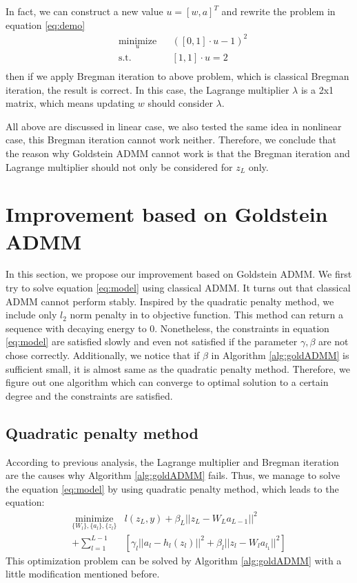 \documentclass[letterpaper, 10 pt, conference]{ieeeconf}  %
\begin{document}
In fact, we can construct a new value $u = [w,a]^T$ and rewrite the problem in equation \eqref{eq:demo}
\begin{equation}
\begin{aligned}
& \underset{u}{\text{minimize}}  & & ([0,1]\cdot u-1)^2 \\
& \text{s.t.} & & [1,1] \cdot u = 2\\
\end{aligned}
\end{equation}
then if we apply Bregman iteration to above problem, which is classical Bregman iteration, the result is correct. In this case, the Lagrange multiplier $\lambda$ is a 2x1 matrix, which means updating $w$ should consider $\lambda$.

All above are discussed in linear case, we also tested the same idea in nonlinear case, this Bregman iteration cannot work neither. Therefore, we conclude that the reason why Goldstein ADMM cannot work is that the Bregman iteration and Lagrange multiplier should not only be considered for $z_L$ only.

\section{Improvement based on Goldstein ADMM} \label{improvement}
In this section, we propose our improvement based on Goldstein ADMM. We first try to solve equation \eqref{eq:model} using classical ADMM. It turns out that classical ADMM cannot perform stably. Inspired by the quadratic penalty method, we include only $l_2$ norm penalty in to objective function. This method can return a sequence with decaying energy to 0. Nonetheless, the constraints in equation \eqref{eq:model} are satisfied slowly and even not satisfied if the parameter $\gamma, \beta$ are not chose correctly. Additionally, we notice that if $\beta$ in Algorithm \ref{alg:goldADMM} is sufficient small, it is almost same as the quadratic penalty method. Therefore, we figure out one algorithm which can converge to optimal solution to a certain degree and the constraints are satisfied.

\subsection{Quadratic penalty method}
According to previous analysis, the Lagrange multiplier and Bregman iteration are the causes why Algorithm \ref{alg:goldADMM} fails. Thus, we manage to solve the equation \eqref{eq:model} by using quadratic penalty method, which leads to the equation:
\begin{equation}
\begin{aligned}
\underset{\{W_l\},\{a_l\}, \{z_l\}}{\text{minimize}} 
& l(z_L,y) + \beta_L||z_L -W_La_{L-1}||^2 \\
+ \sum_{l=1}^{L-1}&[\gamma_l||a_l - h_l(z_l)||^2 + \beta_l||z_l - W_la_{l_1}||^2]
\label{eq:quadratic_only}
\end{aligned}
\end{equation}
This optimization problem can be solved by Algorithm \ref{alg:goldADMM} with a little modification mentioned before.
\end{document}
